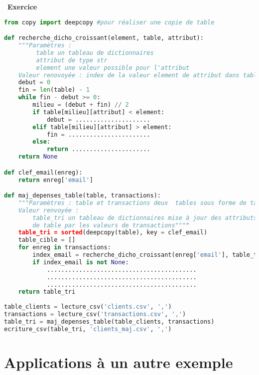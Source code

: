 \documentclass[
  11pt,
]{article}
\newcounter{exo}
\newenvironment{exercice}[1]
{\par \medskip   \addtocounter{exo}{1} \noindent  
\begin{bclogo}[arrondi =0.1,   noborder = true, logo=\bccrayon, marge=4]{~\textbf{Exercice} \textbf{\theexo} {\itshape #1} }  \par}
{
\end{bclogo}
 \par \bigskip }
\newcounter{def}
\begin{document}
\begin{exercice}{}
\begin{lstlisting}[language=Python]
from copy import deepcopy #pour réaliser une copie de table

def recherche_dicho_croissant(element, table, attribut):
    """Paramètres :
         table un tableau de dictionnaires
         attribut de type str
         element une valeur possible pour l'attribut
    Valeur renovoyée : index de la valeur element de attribut dans table"""
    debut = 0
    fin = len(table) - 1
    while fin - debut >= 0:
        milieu = (debut + fin) // 2
        if table[milieu][attribut] < element:
            debut = .....................
        elif table[milieu][attribut] > element:
            fin = .......................
        else:
            return ......................
    return None

def clef_email(enreg):
    return enreg['email']

def maj_depenses_table(table, transactions): 
    """Paramètres : table et transactions deux  tables sous forme de tableaux de dictionnaires
    Valeur renvoyée :
        table_tri un tableau de dictionnaires mise à jour des attributs 'visites' et 'dépenses'
        de table par les valeurs de transactions""""       
    table_tri = sorted(deepcopy(table), key = clef_email)
    table_cible = []
    for enreg in transactions:
        index_email = recherche_dicho_croissant(enreg['email'], table_tri, 'email')
        if index_email is not None:
            ..........................................
            ..........................................
            ..........................................
    return table_tri
                     
table_clients = lecture_csv('clients.csv', ',')
transactions = lecture_csv('transactions.csv', ',') 
table_tri = maj_depenses_table(table_clients, transactions)
ecriture_csv(table_tri, 'clients_maj.csv', ',')
\end{lstlisting}

\end{exercice}

\hypertarget{applications-uxe0-un-autre-exemple}{%
\section{Applications à un autre
exemple}\label{applications-uxe0-un-autre-exemple}}
\end{document}
